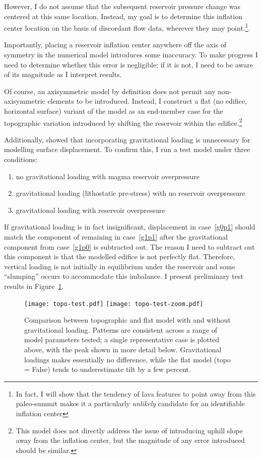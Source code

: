 However, I do not assume that the subsequent reservoir pressure change was centered at this same location. Instead, my goal is to  determine this inflation center location on the basis of discordant flow data, wherever they may point.\footnote{In fact, I will show that the tendency of lava features to point away from this paleo-summit makes it a particularly \emph{unlikely} candidate for an identifiable inflation center}.

Importantly, placing a reservoir inflation center anywhere off the axis of symmetry in the numerical model introduces some inaccuracy. To make progress I need to determine whether this error is negligible; if it is not, I need to be aware of its magnitude as I interpret results.

Of course, an axisymmetric model by definition does not permit any non-axisymmetric elements to be introduced. Instead, I construct a flat (no edifice, horizontal surface) variant of the model as an end-member case for the topographic variation introduced by shifting the reservoir within the edifice.\footnote{This model does not directly address the issue of introducing uphill slope away from the inflation center, but the magnitude of any error introduced should be similar.}

Additionally, \textcite{grosfils_magma_2007} showed that incorporating gravitational loading is unnecessary for modelling surface displacement. To confirm this, I run a test model under three conditions:
\begin{enumerate}
    \item no gravitational loading with magma reservoir overpressure \label{g0p1}
    \item gravitational loading (lithostatic pre-stress) with no reservoir overpressure\label{g1p0}
    \item gravitational loading with reservoir overpressure \label{g1p1}
\end{enumerate}
If gravitational loading is in fact insignificant, displacement in case~\ref{g0p1} should match the component of remaining in case~\ref{g1p1} after the gravitational component from case~\ref{g1p0} is subtracted out. The reason I need to subtract out this component is that the modelled edifice is not perfectly flat. Therefore, vertical loading is not initially in equilibrium under the reservoir and some ``slumping'' occurs to accommodate this imbalance. I present preliminary test results in Figure~\ref{fig:topo-test}.

\begin{figure}
    \texttt{[image: topo-test.pdf]}
    \texttt{[image: topo-test-zoom.pdf]}%
    \caption[Flat Model]{Comparison between topographic and flat model with and without gravitational loading. Patterns are consistent across a range of model parameters tested; a single representative case is plotted above, with the peak shown in more detail below. Gravitational loadings makes essentially no difference, while the flat model (topo = False) tends to underestimate tilt by a few percent.}%
    \label{fig:topo-test}%
\end{figure}

